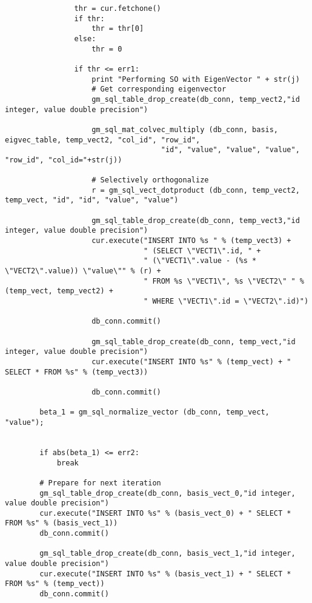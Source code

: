 \documentclass[11pt]{article}
\begin{document}
\begin{lstlisting}
                thr = cur.fetchone()
                if thr:
                    thr = thr[0]
                else:
                    thr = 0
    
                if thr <= err1:
                    print "Performing SO with EigenVector " + str(j)
                    # Get corresponding eigenvector
                    gm_sql_table_drop_create(db_conn, temp_vect2,"id integer, value double precision")
    
                    gm_sql_mat_colvec_multiply (db_conn, basis, eigvec_table, temp_vect2, "col_id", "row_id", 
                                    "id", "value", "value", "value", "row_id", "col_id="+str(j))
    
                    # Selectively orthogonalize
                    r = gm_sql_vect_dotproduct (db_conn, temp_vect2, temp_vect, "id", "id", "value", "value")
    
                    gm_sql_table_drop_create(db_conn, temp_vect3,"id integer, value double precision")
                    cur.execute("INSERT INTO %s " % (temp_vect3) +
                                " (SELECT \"VECT1\".id, " +
                                " (\"VECT1\".value - (%s * \"VECT2\".value)) \"value\"" % (r) + 
                                " FROM %s \"VECT1\", %s \"VECT2\" " % (temp_vect, temp_vect2) +
                                " WHERE \"VECT1\".id = \"VECT2\".id)")                
                                
                    db_conn.commit()
                    
                    gm_sql_table_drop_create(db_conn, temp_vect,"id integer, value double precision")
                    cur.execute("INSERT INTO %s" % (temp_vect) + " SELECT * FROM %s" % (temp_vect3))                
                    
                    db_conn.commit()
        
        beta_1 = gm_sql_normalize_vector (db_conn, temp_vect, "value");

        
        if abs(beta_1) <= err2:
            break
        
        # Prepare for next iteration
        gm_sql_table_drop_create(db_conn, basis_vect_0,"id integer, value double precision")        
        cur.execute("INSERT INTO %s" % (basis_vect_0) + " SELECT * FROM %s" % (basis_vect_1))
        db_conn.commit()
        
        gm_sql_table_drop_create(db_conn, basis_vect_1,"id integer, value double precision")
        cur.execute("INSERT INTO %s" % (basis_vect_1) + " SELECT * FROM %s" % (temp_vect))
        db_conn.commit()
        

\end{lstlisting}
\end{document}
